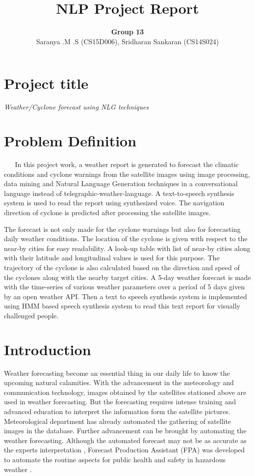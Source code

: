 \documentclass{article}
\title{NLP Project Report}
\author{ {\bf Group 13} \\ \vspace{4mm} Saranya .M .S (CS15D006), Sridharan Sankaran (CS14S024)}
\begin{document}
\maketitle

\section*{Project title}
{ \textit {Weather/Cyclone forecast using NLG techniques}}

\section*{Problem Definition}
$\quad \; $ In this project work, a weather report is generated to forecast the climatic conditions and cyclone warnings from the satellite images using image processing, data mining and Natural Language Generation techniques in a conversational language instead of telegraphic-weather-language. A text-to-speech synthesis system is used to read the report using synthesized voice. The navigation direction of cyclone is predicted after processing the satellite images. 

The forecast is not only made for the cyclone warnings but also for forecasting daily weather conditions. The location of the cyclone is given with respect to the near-by cities for easy readability.
A look-up table with  list of near-by cities along with their latitude and longitudinal values is used for this purpose. The trajectory of the cyclone is also calculated based on the direction and speed of the cyclones along with the nearby target cities. A 5-day weather forecast is made with the time-series of various weather parameters over a period of 5 days given by an open weather API. Then a text to speech synthesis system is implemented using HMM based speech synthesis system to read this text report for visually challenged people. 

\newpage
\vspace{-3cm}
\section{Introduction}
\label{sec:intro}
Weather forecasting become an essential thing in our daily life to know the upcoming 
natural calamities. With the advancement in the meteorology and communication 
technology, images obtained by the satellites stationed above are used in weather
forecasting. But the forecasting requires intense training and advanced education to 
interpret the information form the satellite pictures. Meteorological department has already
automated the gathering of satellite images in the database. Further advancement can be
brought by automating the weather forecasting. Although the automated forecast may not
be as accurate as the experts interpretation \cite{weatherReport}, Forecast Production Assistant (FPA) was 
developed to automate the routine aspects for public health and safety in hazardous
 weather \cite{fpa}. 
\end{document}

